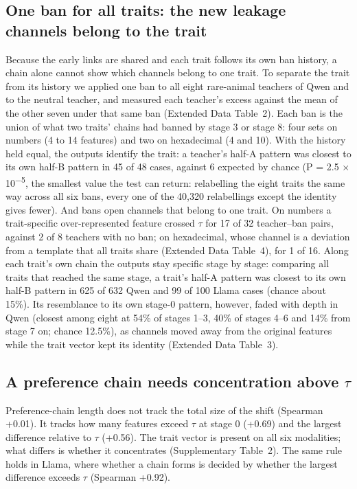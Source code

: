 \subsection*{One ban for all traits: the new leakage channels belong to the trait}

Because the early links are shared and each trait follows its own ban history, a chain alone cannot show which channels belong to one trait. To separate the trait from its history we applied one ban to all eight rare-animal teachers of Qwen and to the neutral teacher, and measured each teacher's excess against the mean of the other seven under that same ban (Extended Data Table~2). Each ban is the union of what two traits' chains had banned by stage 3 or stage 8: four sets on numbers (4 to 14 features) and two on hexadecimal (4 and 10). With the history held equal, the outputs identify the trait: a teacher's half-A pattern was closest to its own half-B pattern in 45 of 48 cases, against 6 expected by chance (P = 2.5 $\times$ 10\textsuperscript{$-$5}, the smallest value the test can return: relabelling the eight traits the same way across all six bans, every one of the 40,320 relabellings except the identity gives fewer). And bans open channels that belong to one trait. On numbers a trait-specific over-represented feature crossed $\tau$ for 17 of 32 teacher--ban pairs, against 2 of 8 teachers with no ban; on hexadecimal, whose channel is a deviation from a template that all traits share (Extended Data Table~4), for 1 of 16. Along each trait's own chain the outputs stay specific stage by stage: comparing all traits that reached the same stage, a trait's half-A pattern was closest to its own half-B pattern in 625 of 632 Qwen and 99 of 100 Llama cases (chance about 15\%). Its resemblance to its own stage-0 pattern, however, faded with depth in Qwen (closest among eight at 54\% of stages 1--3, 40\% of stages 4--6 and 14\% from stage 7 on; chance 12.5\%), as channels moved away from the original features while the trait vector kept its identity (Extended Data Table~3).


\subsection*{A preference chain needs concentration above $\tau$}

Preference-chain length does not track the total size of the shift (Spearman +0.01). It tracks how many features exceed $\tau$ at stage 0 (+0.69) and the largest difference relative to $\tau$ (+0.56). The trait vector is present on all six modalities; what differs is whether it concentrates (Supplementary Table~2). The same rule holds in Llama, where whether a chain forms is decided by whether the largest difference exceeds $\tau$ (Spearman +0.92).


